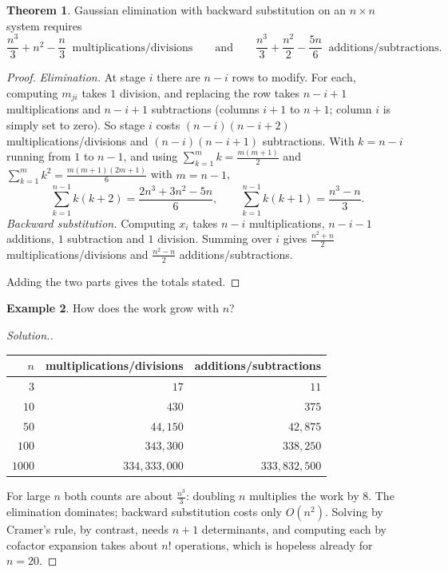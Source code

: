 \documentclass[11pt,a4paper]{article}
\numberwithin{equation}{section}
\theoremstyle{definition}
\newtheorem{thm}{Theorem}[subsection]
\newtheorem{exa}[thm]{Example}
\newenvironment{solution}
  {\renewcommand{\qedsymbol}{}\begin{proof}[\textit{Solution}.]}
  {\end{proof}}
\begin{document}
\begin{thm}
\label{thm:opcount}
Gaussian elimination with backward substitution on an $n\times n$ system requires
$$\frac{n^3}{3}+n^2-\frac{n}{3}\ \text{ multiplications/divisions}\qquad\text{and}\qquad \frac{n^3}{3}+\frac{n^2}{2}-\frac{5n}{6}\ \text{ additions/subtractions.}$$
\end{thm}

\begin{proof}
\emph{Elimination.} At stage $i$ there are $n-i$ rows to modify. For each, computing $m_{ji}$ takes $1$ division, and replacing the row
takes $n-i+1$ multiplications and $n-i+1$ subtractions (columns $i+1$ to $n+1$; column $i$ is simply set to zero). So stage $i$ costs
$(n-i)(n-i+2)$ multiplications/divisions and $(n-i)(n-i+1)$ subtractions. With $k = n-i$ running from $1$ to $n-1$, and using
$\sum_{k=1}^{m}k = \frac{m(m+1)}2$ and $\sum_{k=1}^mk^2 = \frac{m(m+1)(2m+1)}{6}$ with $m = n-1$,
$$\sum_{k=1}^{n-1}k(k+2) = \frac{2n^3+3n^2-5n}{6},\qquad \sum_{k=1}^{n-1}k(k+1) = \frac{n^3-n}{3} .$$
\emph{Backward substitution.} Computing $x_i$ takes $n-i$ multiplications, $n-i-1$ additions, $1$ subtraction and $1$ division. Summing over
$i$ gives $\frac{n^2+n}{2}$ multiplications/divisions and $\frac{n^2-n}{2}$ additions/subtractions.

Adding the two parts gives the totals stated.
\end{proof}

\begin{exa}
How does the work grow with $n$?
\end{exa}

\begin{solution}
\begin{center}
\begin{tabular}{rrr}
\hline
$n$ & multiplications/divisions & additions/subtractions\\
\hline
$3$ & $17$ & $11$\\
$10$ & $430$ & $375$\\
$50$ & $44{,}150$ & $42{,}875$\\
$100$ & $343{,}300$ & $338{,}250$\\
$1000$ & $334{,}333{,}000$ & $333{,}832{,}500$\\
\hline
\end{tabular}
\end{center}
For large $n$ both counts are about $\frac{n^3}{3}$: doubling $n$ multiplies the work by $8$. The elimination dominates; backward
substitution costs only $O(n^2)$. Solving by Cramer's rule, by contrast, needs $n+1$ determinants, and computing each by cofactor
expansion takes about $n!$ operations, which is hopeless already for $n = 20$.
\end{solution}
\end{document}
